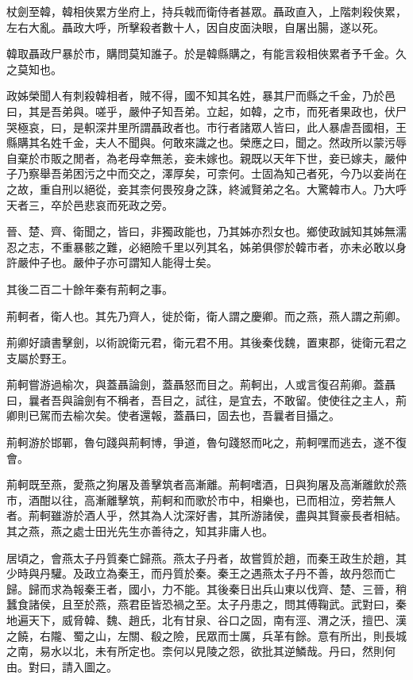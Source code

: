 杖劍至韓，韓相俠累方坐府上，持兵戟而衛侍者甚眾。聶政直入，上階刺殺俠累，左右大亂。聶政大呼，所擊殺者數十人，因自皮面決眼，自屠出腸，遂以死。

韓取聶政尸暴於市，購問莫知誰子。於是韓縣購之，有能言殺相俠累者予千金。久之莫知也。

政姊榮聞人有刺殺韓相者，賊不得，國不知其名姓，暴其尸而縣之千金，乃於邑曰，其是吾弟與。嗟乎，嚴仲子知吾弟。立起，如韓，之市，而死者果政也，伏尸哭極哀，曰，是軹深井里所謂聶政者也。市行者諸眾人皆曰，此人暴虐吾國相，王縣購其名姓千金，夫人不聞與。何敢來識之也。榮應之曰，聞之。然政所以蒙污辱自棄於市販之閒者，為老母幸無恙，妾未嫁也。親既以天年下世，妾已嫁夫，嚴仲子乃察舉吾弟困污之中而交之，澤厚矣，可柰何。士固為知己者死，今乃以妾尚在之故，重自刑以絕從，妾其柰何畏歿身之誅，終滅賢弟之名。大驚韓市人。乃大呼天者三，卒於邑悲哀而死政之旁。

晉、楚、齊、衛聞之，皆曰，非獨政能也，乃其姊亦烈女也。鄉使政誠知其姊無濡忍之志，不重暴骸之難，必絕險千里以列其名，姊弟俱僇於韓市者，亦未必敢以身許嚴仲子也。嚴仲子亦可謂知人能得士矣。

其後二百二十餘年秦有荊軻之事。

荊軻者，衛人也。其先乃齊人，徙於衛，衛人謂之慶卿。而之燕，燕人謂之荊卿。

荊卿好讀書擊劍，以術說衛元君，衛元君不用。其後秦伐魏，置東郡，徙衛元君之支屬於野王。

荊軻嘗游過榆次，與蓋聶論劍，蓋聶怒而目之。荊軻出，人或言復召荊卿。蓋聶曰，曩者吾與論劍有不稱者，吾目之，試往，是宜去，不敢留。使使往之主人，荊卿則已駕而去榆次矣。使者還報，蓋聶曰，固去也，吾曩者目攝之。

荊軻游於邯鄲，魯句踐與荊軻博，爭道，魯句踐怒而叱之，荊軻嘿而逃去，遂不復會。

荊軻既至燕，愛燕之狗屠及善擊筑者高漸離。荊軻嗜酒，日與狗屠及高漸離飲於燕市，酒酣以往，高漸離擊筑，荊軻和而歌於市中，相樂也，已而相泣，旁若無人者。荊軻雖游於酒人乎，然其為人沈深好書，其所游諸侯，盡與其賢豪長者相結。其之燕，燕之處士田光先生亦善待之，知其非庸人也。

居頃之，會燕太子丹質秦亡歸燕。燕太子丹者，故嘗質於趙，而秦王政生於趙，其少時與丹驩。及政立為秦王，而丹質於秦。秦王之遇燕太子丹不善，故丹怨而亡歸。歸而求為報秦王者，國小，力不能。其後秦日出兵山東以伐齊、楚、三晉，稍蠶食諸侯，且至於燕，燕君臣皆恐禍之至。太子丹患之，問其傅鞠武。武對曰，秦地遍天下，威脅韓、魏、趙氏，北有甘泉、谷口之固，南有涇、渭之沃，擅巴、漢之饒，右隴、蜀之山，左關、殽之險，民眾而士厲，兵革有餘。意有所出，則長城之南，易水以北，未有所定也。柰何以見陵之怨，欲批其逆鱗哉。丹曰，然則何由。對曰，請入圖之。

